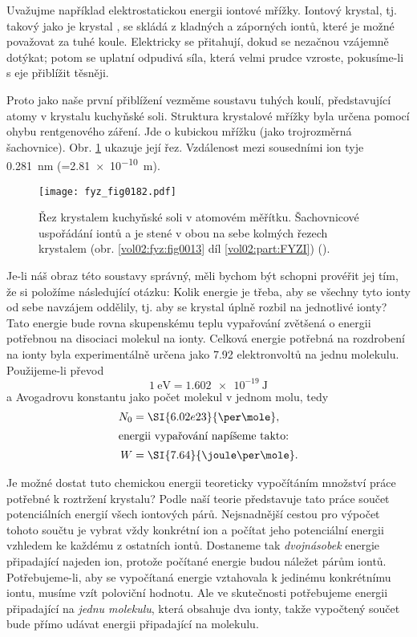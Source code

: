     Uvažujme například elektrostatickou energii iontové mřížky. Iontový krystal, tj. takový jako je
    krystal , se skládá z kladných a záporných iontů, které je možné považovat za tuhé
    koule. Elektricky se přitahují, dokud se nezačnou vzájemně dotýkat; potom se uplatní odpudivá
    síla, která velmi prudce vzroste, pokusíme-li s eje přiblížit těsněji.
    
    Proto jako naše první přiblížení vezměme soustavu tuhých koulí, představující atomy v krystalu
    kuchyňské soli. Struktura krystalové mřížky byla určena pomocí ohybu rentgenového záření. Jde o
    kubickou mřížku (jako trojrozměrná šachovnice). Obr. \ref{fyz:fig0182} ukazuje její řez.
    Vzdálenost mezi sousedními ion tyje \SI{0.281}{\nm} (=\SI{2.81e-10}{\m}).
    
    \begin{figure}[ht!]  %
      \centering
      \texttt{[image: fyz\_fig0182.pdf]}
      \caption{Řez krystalem kuchyňské soli v atomovém měřítku. Šachovnicové uspořádání iontů  
              a  je stené v obou na sebe kolmých řezech krystalem (obr.
              \ref{vol02:fyz:fig0013} díl \ref{vol02:part:FYZI}) (\cite[s.~146]{Feynman02}).}
      \label{fyz:fig0182}
    \end{figure}

    Je-li náš obraz této soustavy správný, měli bychom být schopni provéřit jej tím, že si položíme
    následující otázku: Kolik energie je třeba, aby se všechny tyto ionty od sebe navzájem oddělily,
    tj. aby se krystal úplně rozbil na jednotlivé ionty? Tato energie bude rovna skupenskému teplu
    vypařování  zvětšená o energii potřebnou na disociaci molekul na ionty. Celková energie
    potřebná na rozdrobení  na ionty byla experimentálně určena jako \num{7.92}
    elektronvoltů na jednu molekulu. Použijeme-li převod
    \begin{equation*}
      \SI{1}{\electronvolt} = \SI{1.602e-19}{\joule}
    \end{equation*}
    a Avogadrovu konstantu jako počet molekul v jednom molu, tedy
    \begin{align*}
      N_0 &= \SI{6.02e23}{\per\mole},  \\
      \shortintertext{energii vypařování napíšeme takto:}
      W   &= \SI{7.64}{\joule\per\mole}.
    \end{align*}

    Je možné dostat tuto chemickou energii teoreticky vypočítáním množství práce potřebné k
    roztržení krystalu? Podle naší teorie představuje tato práce součet potenciálních energií všech
    iontových párů. Nejsnadnější cestou pro výpočet tohoto součtu je vybrat vždy konkrétní ion a
    počítat jeho potenciální energii vzhledem ke každému z ostatních iontů. Dostaneme tak
    \emph{dvojnásobek} energie připadající najeden ion, protože počítané energie budou náležet párům
    iontů. Potřebujeme-li, aby se vypočítaná energie vztahovala k jedinému konkrétnímu iontu, musíme
    vzít poloviční hodnotu. Ale ve skutečnosti potřebujeme energii připadající na \emph{jednu
    molekulu}, která obsahuje dva ionty, takže vypočtený součet bude přímo udávat energii
    připadající na molekulu.

